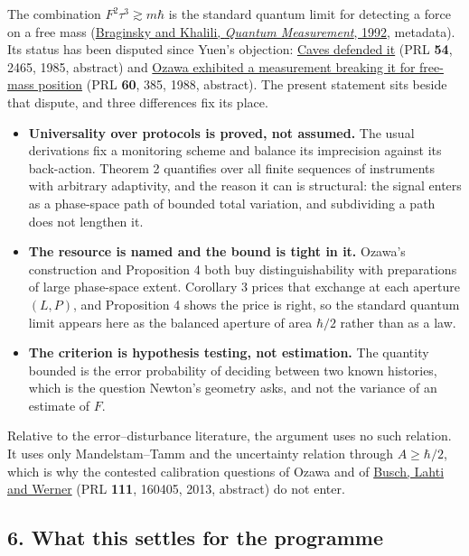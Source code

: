 \documentclass[11pt,a4paper]{article}
\newcommand{\tightlist}{\setlength{\itemsep}{0pt}\setlength{\parskip}{0pt}}
\begin{document}
The combination \(F^2\tau^3\gtrsim m\hbar\) is the standard quantum
limit for detecting a force on a free mass
(\href{https://doi.org/10.1017/CBO9780511622748}{Braginsky and Khalili,
\emph{Quantum Measurement}, 1992}, metadata). Its status has been
disputed since Yuen's objection:
\href{https://doi.org/10.1103/PhysRevLett.54.2465}{Caves defended it}
(PRL \textbf{54}, 2465, 1985, abstract) and
\href{https://doi.org/10.1103/PhysRevLett.60.385}{Ozawa exhibited a
measurement breaking it for free-mass position} (PRL \textbf{60}, 385,
1988, abstract). The present statement sits beside that dispute, and
three differences fix its place.

\begin{itemize}
\tightlist
\item
  \textbf{Universality over protocols is proved, not assumed.} The usual
  derivations fix a monitoring scheme and balance its imprecision
  against its back-action. Theorem 2 quantifies over all finite
  sequences of instruments with arbitrary adaptivity, and the reason it
  can is structural: the signal enters as a phase-space path of bounded
  total variation, and subdividing a path does not lengthen it.
\item
  \textbf{The resource is named and the bound is tight in it.} Ozawa's
  construction and Proposition 4 both buy distinguishability with
  preparations of large phase-space extent. Corollary 3 prices that
  exchange at each aperture \((L,P)\), and Proposition 4 shows the price
  is right, so the standard quantum limit appears here as the balanced
  aperture of area \(\hbar/2\) rather than as a law.
\item
  \textbf{The criterion is hypothesis testing, not estimation.} The
  quantity bounded is the error probability of deciding between two
  known histories, which is the question Newton's geometry asks, and not
  the variance of an estimate of \(F\).
\end{itemize}

Relative to the error--disturbance literature, the argument uses no such
relation. It uses only Mandelstam--Tamm and the uncertainty relation
through \(A\ge\hbar/2\), which is why the contested calibration
questions of Ozawa and of
\href{https://doi.org/10.1103/PhysRevLett.111.160405}{Busch, Lahti and
Werner} (PRL \textbf{111}, 160405, 2013, abstract) do not enter.

\hypertarget{what-this-settles-for-the-programme}{%
\subsection{6. What this settles for the
programme}\label{what-this-settles-for-the-programme}}
\end{document}
